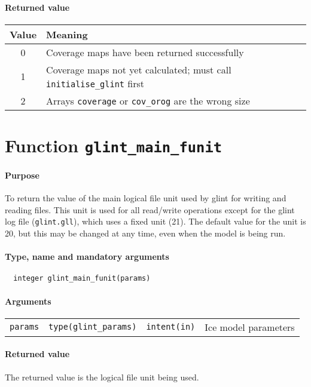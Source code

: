 \paragraph{Returned value}
%
\begin{center}
\begin{tabular}{|c|l|}
\hline
Value & Meaning \\
\hline
\hline
0 & Coverage maps have been returned successfully \\
1 & Coverage maps not yet calculated; must call \texttt{initialise\_glint}
first \\
2 & Arrays \texttt{coverage} or \texttt{cov\_orog} are the wrong size \\
\hline
\end{tabular}
\end{center}
%
\section{Function \texttt{glint\_main\_funit}}
%
\paragraph{Purpose}
%
To return the value of the main logical file unit used by glint for writing
and reading files. This unit is used for all read/write operations except for
the glint log file (\texttt{glint.gll}), which uses a fixed unit (21). The
default value for the unit is 20, but this may be changed at any time, even
when the model is being run.
%
\paragraph{Type, name and mandatory arguments}
%
\begin{verbatim}
  integer glint_main_funit(params)
\end{verbatim}
%
\paragraph{Arguments}
%
\begin{center}
\begin{tabular}{llll}
\texttt{params} & \texttt{type(glint\_params)} & \texttt{intent(in)} & Ice model parameters \\
\end{tabular}
\end{center}
%
\paragraph{Returned value}
%
The returned value is the logical file unit being used.
%

